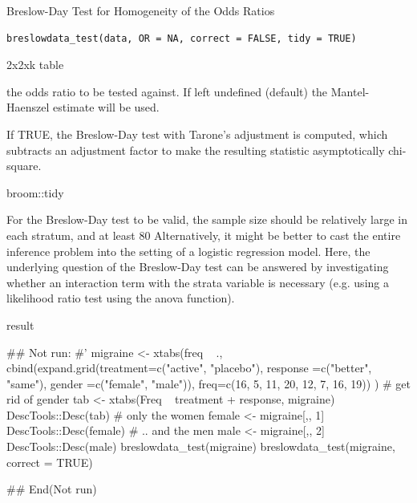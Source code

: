 \documentclass[a4paper]{book}
\begin{document}
%
\begin{Description}
Breslow-Day Test for Homogeneity of the Odds Ratios
\end{Description}
%
\begin{Usage}
\begin{verbatim}
breslowdata_test(data, OR = NA, correct = FALSE, tidy = TRUE)
\end{verbatim}
\end{Usage}
%
\begin{Arguments}
\begin{ldescription}
\item[\code{data}] 2x2xk table

\item[\code{OR}] the odds ratio to be tested against. If left undefined (default) the Mantel-Haenszel estimate will be used.

\item[\code{correct}] If TRUE, the Breslow-Day test with Tarone's adjustment is computed, which subtracts an adjustment factor to make the resulting statistic asymptotically chi-square.

\item[\code{tidy}] broom::tidy
\end{ldescription}
\end{Arguments}
%
\begin{Details}
For the Breslow-Day test to be valid, the sample size should be relatively large in each stratum, and at least 80
Alternatively, it might be better to cast the entire inference problem into the setting of a logistic regression model. Here, the underlying question of the Breslow-Day test can be answered by investigating whether an interaction term with the strata variable is necessary (e.g. using a likelihood ratio test using the anova function).
\end{Details}
%
\begin{Value}
result
\end{Value}
%
\begin{Examples}
\begin{ExampleCode}
\#\# Not run: 
#'
migraine <- xtabs(freq ~ .,
                  cbind(expand.grid(treatment=c("active", "placebo"),
                                    response =c("better", "same"),
                                    gender   =c("female", "male")),
                        freq=c(16, 5, 11, 20, 12, 7, 16, 19))
)
# get rid of gender
tab <- xtabs(Freq ~ treatment + response, migraine)
DescTools::Desc(tab)
# only the women
female <- migraine[,, 1]
DescTools::Desc(female)
# .. and the men
male <- migraine[,, 2]
DescTools::Desc(male)
breslowdata_test(migraine)
breslowdata_test(migraine, correct = TRUE)


## End(Not run)
\end{ExampleCode}
\end{Examples}
\end{document}
